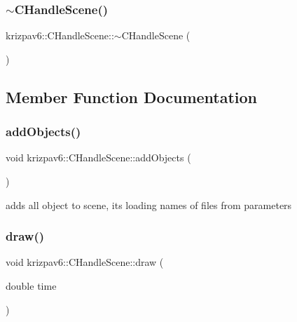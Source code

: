 \subsubsection{\texorpdfstring{$\sim$CHandleScene()}{~CHandleScene()}}
{\footnotesize\ttfamily krizpav6\+::\+C\+Handle\+Scene\+::$\sim$\+C\+Handle\+Scene (\begin{DoxyParamCaption}{ }\end{DoxyParamCaption})}



\subsection{Member Function Documentation}
\mbox{\label{classkrizpav6_1_1_c_handle_scene_a87b33beb89fe21fd30137fe007f0d548}} 
\subsubsection{\texorpdfstring{addObjects()}{addObjects()}}
{\footnotesize\ttfamily void krizpav6\+::\+C\+Handle\+Scene\+::add\+Objects (\begin{DoxyParamCaption}{ }\end{DoxyParamCaption})\hspace{0.3cm}{\ttfamily [inline]}}



adds all object to scene, its loading names of files from parameters 

\mbox{\label{classkrizpav6_1_1_c_handle_scene_a2676a363356cb3d48b53ce09fd2f644a}} 
\subsubsection{\texorpdfstring{draw()}{draw()}}
{\footnotesize\ttfamily void krizpav6\+::\+C\+Handle\+Scene\+::draw (\begin{DoxyParamCaption}\item[{double}]{time }\end{DoxyParamCaption})}



